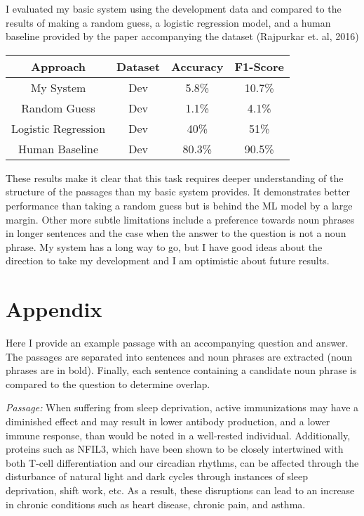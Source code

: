 \documentclass[a4paper, 11pt]{article} %
\begin{document}
I evaluated my basic system using the development data and compared to the results of making a random guess, a logistic regression model, and a human baseline provided by the paper accompanying the dataset (Rajpurkar et. al, 2016)

\begin{table}[H]
\centering
{\renewcommand{\arraystretch}{1.2}%
\begin{tabular}{| c | c | c | c |}
\hline
Approach & Dataset & Accuracy & F1-Score\\
\hline
My System & Dev & 5.8\% & 10.7\%\\ \hline
Random Guess & Dev & 1.1\% & 4.1\%\\ \hline
Logistic Regression & Dev & 40\% & 51\%\\ \hline
Human Baseline & Dev & 80.3\% & 90.5\%\\ \hline
\end{tabular}}
\end{table}

These results make it clear that this task requires deeper understanding of the structure of the passages than my basic system provides. It demonstrates better performance than taking a random guess but is behind the ML model by a large margin. Other more subtle limitations include a preference towards noun phrases in longer sentences and the case when the answer to the question is not a noun phrase. My system has a long way to go, but I have good ideas about the direction to take my development and I am optimistic about future results.

\section*{Appendix}

Here I provide an example passage with an accompanying question and answer. The passages are separated into sentences and noun phrases are extracted (noun phrases are in bold). Finally, each sentence containing a candidate noun phrase is compared to the question to determine overlap.  \bigskip


\textit{Passage:} When suffering from sleep deprivation, active immunizations may have a diminished effect and may result in lower antibody production, and a lower immune response, than would be noted in a well-rested individual. Additionally, proteins such as NFIL3, which have been shown to be closely intertwined with both T-cell differentiation and our circadian rhythms, can be affected through the disturbance of natural light and dark cycles through instances of sleep deprivation, shift work, etc. As a result, these disruptions can lead to an increase in chronic conditions such as heart disease, chronic pain, and asthma. \bigskip
\end{document}

